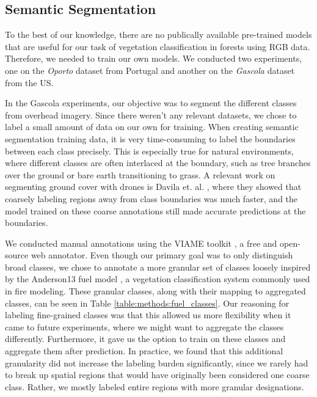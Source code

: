 \subsection{Semantic Segmentation} \label{sec:semseg}
To the best of our knowledge, there are no publically available pre-trained models that are useful for our task of vegetation classification in forests using RGB data. Therefore, we needed to train our own models. We conducted two experiments, one on the \textit{Oporto} dataset from Portugal and another on the \textit{Gascola} dataset from the US. 

In the Gascola experiments, our objective was to segment the different classes from overhead imagery. Since there weren't any relevant datasets, we chose to label a small amount of data on our own for training. When creating semantic segmentation training data, it is very time-consuming to label the boundaries between each class precisely. This is especially true for natural environments, where different classes are often interlaced at the boundary, such as tree branches over the ground or bare earth transitioning to grass. A relevant work on segmenting ground cover with drones is Davila et. al. \cite{Davila2022ADAPT:AI}, where they showed that coarsely labeling regions away from class boundaries was much faster, and the model trained on these coarse annotations still made accurate predictions at the boundaries.

We conducted manual annotations using the VIAME toolkit \cite{Dawkins2017AnAnalytics}, a free and open-source web annotator. Even though our primary goal was to only distinguish broad classes, we chose to annotate a more granular set of classes loosely inspired by the Anderson13 fuel model \cite{anderson1981aids}, a vegetation classification system commonly used in fire modeling. These granular classes, along with their mapping to aggregated classes, can be seen in Table \ref{table:methods:fuel_classes}. Our reasoning for labeling fine-grained classes was that this allowed us more flexibility when it came to future experiments, where we might want to aggregate the classes differently. Furthermore, it gave us the option to train on these classes and aggregate them after prediction. In practice, we found that this additional granularity did not increase the labeling burden significantly, since we rarely had to break up spatial regions that would have originally been considered one coarse class. Rather, we mostly labeled entire regions with more granular designations. 



